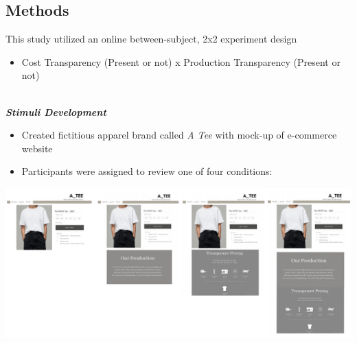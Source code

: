\documentclass[a0,portrait]{a0poster}
\begin{document}
\begin{minipage}[c]{\linewidth}
\begin{framed}
\begin{multicols}{2}
\section*{Methods}
\color{Black}
 This study utilized an online between-subject, 2x2 experiment design	
\begin{itemize}
    \item Cost Transparency (Present or not) x Production Transparency (Present or not) 
\end{itemize}
\\
\color{Maroon}
\textbf{\emph{Stimuli Development}}
\color{Black}
\begin{itemize}
    \item Created fictitious apparel brand called \textit{A\text{\_} Tee} with mock-up of e-commerce website
    \item Participants were assigned to review one of four conditions:
    \end{itemize}
   
   
\begin{center}
\includegraphics[width=1.0\linewidth]{AEJMC-Brand_Auth-Stimuli-Figure}
\label{ALICerros}
\end{center}


\end{multicols}
\end{framed}
\end{minipage}
\end{document}
